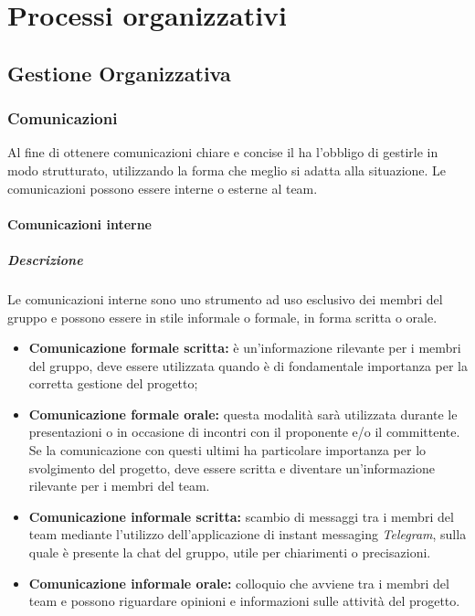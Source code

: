 \newpage

\section{Processi organizzativi}

	\subsection{Gestione Organizzativa}
		
		\subsubsection{Comunicazioni}
		Al fine di ottenere comunicazioni chiare e concise il \textit{\RdP} ha l'obbligo di gestirle in modo strutturato, utilizzando la forma che meglio si adatta alla situazione. Le comunicazioni possono essere interne o esterne al team.
			
			\paragraph{Comunicazioni interne}
			\subparagraph{Descrizione}
			Le comunicazioni interne sono uno strumento ad uso esclusivo dei membri del gruppo e possono essere in stile informale o formale, in forma scritta o orale. 
				\begin{itemize}
					\item \textbf{Comunicazione formale scritta:} è un'informazione rilevante per i membri del gruppo, deve essere utilizzata quando è di fondamentale importanza per la corretta gestione del progetto;
					\item \textbf{Comunicazione formale orale:} questa modalità sarà utilizzata durante le presentazioni o in occasione di incontri con il proponente e/o il committente. Se la comunicazione con questi ultimi ha particolare importanza per lo svolgimento del progetto, deve essere scritta e diventare un'informazione rilevante per i membri del team.
					\item \textbf{Comunicazione informale scritta:} scambio di messaggi tra i membri del team mediante l'utilizzo dell'applicazione di instant messaging \textit{Telegram}, sulla quale è presente la chat del gruppo, utile per chiarimenti o precisazioni.
					\item \textbf{Comunicazione informale orale:} colloquio che avviene tra i membri del team e possono riguardare opinioni e informazioni sulle attività del progetto. 
				\end{itemize}

